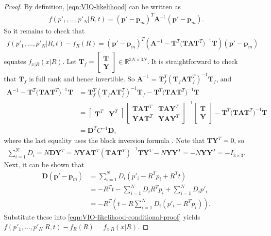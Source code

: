 \begin{proof}
	By definition, \eqref{eqn:VIO-likelihood} can be written as
	\begin{align*}
		f(p'_1,\ldots,p'_N | R,t) = (\bm{p}'-\bm{p}_m)^T \mathbf{A}^{-1} (\bm{p}'-\bm{p}_m).
	\end{align*}
	So it remains to check that
	\begin{align} \label{eqn:VIO-likelihood-conditional-proof}
		f(p'_1,\ldots,p'_N | R,t) - f_R(R) = (\bm{p}'-\bm{p}_m)^T \left( \mathbf{A}^{-1} - \mathbf{T}^T \big(\mathbf{T}\mathbf{A}\mathbf{T}^T\big)^{-1} \mathbf{T} \right) (\bm{p}'-\bm{p}_m)
	\end{align}
	equates $f_{x|R}(x|R)$.
	Let $\mathbf{T}_f = \begin{bmatrix} \mathbf{T} \\ \mathbf{Y} \end{bmatrix}\in\mathbb{R}^{3N\times 3N}$.
	It is straightforward to check that $\mathbf{T}_f$ is full rank and hence invertible.
	So $\mathbf{A}^{-1} = \mathbf{T}_f^T (\mathbf{T}_f\mathbf{A}\mathbf{T}_f^T)^{-1} \mathbf{T}_f$, and
	\begin{align*}
		\mathbf{A}^{-1} - \mathbf{T}^T \big(\mathbf{T}\mathbf{A}\mathbf{T}^T\big)^{-1} \mathbf{T} &= \mathbf{T}_f^T (\mathbf{T}_f\mathbf{A}\mathbf{T}_f^T)^{-1} \mathbf{T}_f - \mathbf{T}^T \big(\mathbf{T}\mathbf{A}\mathbf{T}^T\big)^{-1} \mathbf{T} \\
		&= \begin{bmatrix} \mathbf{T}^T & \mathbf{Y}^T \end{bmatrix} \begin{bmatrix} \mathbf{T}\mathbf{A}\mathbf{T}^T & \mathbf{T}\mathbf{A}\mathbf{Y}^T \\ \mathbf{Y}\mathbf{A}\mathbf{T}^T & \mathbf{Y}\mathbf{A}\mathbf{Y}^T\end{bmatrix}^{-1} \begin{bmatrix} \mathbf{T} \\ \mathbf{Y} \end{bmatrix} - \mathbf{T}^T \big(\mathbf{T}\mathbf{A}\mathbf{T}^T\big)^{-1} \mathbf{T} \\
		&= \mathbf{D}^T C^{-1} \mathbf{D},
	\end{align*}
	where the last equality uses the block inversion formula \cite{petersen2008matrix}.
	Note that $\mathbf{TY}^T = 0$, so
	\begin{align*}
		\sum_{i=1}^N D_i = N\mathbf{DY}^T = N\mathbf{YAT}^T (\mathbf{TAT}^T)^{-1} \mathbf{TY}^T - N\mathbf{YY}^T = -N\mathbf{YY}^T = -I_{3\times 3}.
	\end{align*}
	Next, it can be shown that
	\begin{align*}
		\mathbf{D}(\bm{p}' - \bm{p}_m) &= \sum_{i=1}^N D_i(p'_i - R^Tp_i + R^Tt) \\
		&= -R^Tt - \sum_{i=1}^N D_iR^Tp_i + \sum_{i=1}^N D_ip'_i \\
		&= -R^T\left( t - R\sum_{i=1}^N D_i(p'_i-R^Tp_i) \right).
	\end{align*}
	Substitute these into \eqref{eqn:VIO-likelihood-conditional-proof} yields $f(p'_1,\ldots,p'_N | R,t) - f_R(R) = f_{x|R}(x|R)$.
\end{proof}

